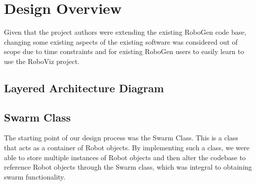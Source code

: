 \documentclass[11pt,a4paper]{article}
\begin{document}
\section{Design Overview}
\label{s:design-overview}
%
%
%

Given that the project authors were extending the existing RoboGen
\cite{robogen} code base, changing some existing aspects of the existing
software was considered out of scope due to time constraints and for existing
RoboGen users to easily learn to use the RoboViz project.


\subsection{Layered Architecture Diagram}
\subsection{Swarm Class}

The starting point of our design process was the Swarm Class.
This is a class that acts as a container of Robot objects. By implementing such a class,
we were able to store multiple instances of Robot objects and then alter the codebase to
reference Robot objects through the Swarm class, which was integral to obtaining swarm functionality.
\end{document}
